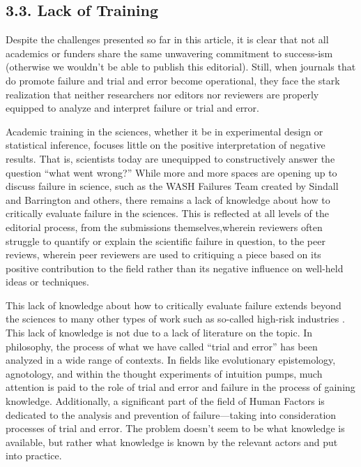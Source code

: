 \documentclass{article}
\begin{document}
\subsection{3\textbf{.3. }\textbf{Lack of Training }}

\textbf{}Despite the challenges presented so far in this article, it is clear that not all academics or funders share the same unwavering commitment to success-ism (otherwise we wouldn't be able to publish this editorial). Still, when journals that do promote failure and trial and error become operational, they face the stark realization that neither researchers nor editors nor reviewers are properly equipped to analyze and interpret failure or trial and error. 

Academic training in the sciences, whether it be in experimental design or statistical inference, focuses little on the positive interpretation of negative results. That is, scientists today are unequipped to constructively answer the question “what went wrong?” While more and more spaces are opening up to discuss failure in science, such as the WASH Failures Team created by Sindall and Barrington and others, there remains a lack of knowledge about how to critically evaluate failure in the sciences. This is reflected at all levels of the editorial process, from the submissions themselves,wherein reviewers often struggle to quantify or explain the scientific failure in question, to the peer reviews, wherein peer reviewers are used to critiquing a piece based on its positive contribution to the field rather than its negative influence on well-held ideas or techniques. 

This lack of knowledge about how to critically evaluate failure extends beyond the sciences to many other types of work such as so-called high-risk industries \parencite{Bevilacqua2018}. This lack of knowledge is not due to a lack of literature on the topic. In philosophy, the process of what we have called “trial and error” has been analyzed in a wide range of contexts. In fields like evolutionary epistemology, agnotology, and within the thought experiments of intuition pumps, much attention is paid to the role of trial and error and failure in the process of gaining knowledge. Additionally, a significant part of the field of Human Factors is dedicated to the analysis and prevention of failure—taking into consideration processes of trial and error. The problem doesn't seem to be what knowledge is available, but rather what knowledge is known by the relevant actors and put into practice. 
\end{document}

